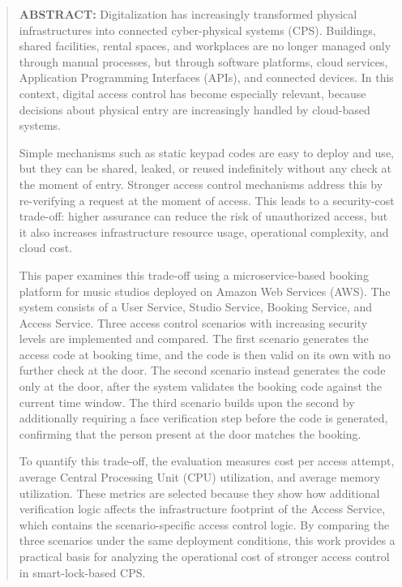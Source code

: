 \begin{abstract}
\textbf{ABSTRACT:}
Digitalization has increasingly transformed physical infrastructures into connected cyber-physical systems (CPS). Buildings, shared facilities, rental spaces, and workplaces are no longer managed only through manual processes, but through software platforms, cloud services, Application Programming Interfaces (APIs), and connected devices. In this context, digital access control has become especially relevant, because decisions about physical entry are increasingly handled by cloud-based systems.

Simple mechanisms such as static keypad codes are easy to deploy and use, but they can be shared, leaked, or reused indefinitely without any check at the moment of entry. Stronger access control mechanisms address this by re-verifying a request at the moment of access. This leads to a security-cost trade-off: higher assurance can reduce the risk of unauthorized access, but it also increases infrastructure resource usage, operational complexity, and cloud cost.

This paper examines this trade-off using a microservice-based booking platform for music studios deployed on Amazon Web Services (AWS). The system consists of a User Service, Studio Service, Booking Service, and Access Service. Three access control scenarios with increasing security levels are implemented and compared. The first scenario generates the access code at booking time, and the code is then valid on its own with no further check at the door. The second scenario instead generates the code only at the door, after the system validates the booking code against the current time window. The third scenario builds upon the second by additionally requiring a face verification step before the code is generated, confirming that the person present at the door matches the booking.

To quantify this trade-off, the evaluation measures cost per access attempt, average Central Processing Unit (CPU) utilization, and average memory utilization. These metrics are selected because they show how additional verification logic affects the infrastructure footprint of the Access Service, which contains the scenario-specific access control logic. By comparing the three scenarios under the same deployment conditions, this work provides a practical basis for analyzing the operational cost of stronger access control in smart-lock-based CPS.
\end{abstract}